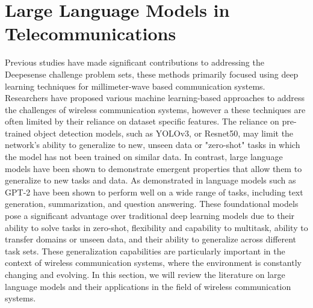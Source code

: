 \section{Large Language Models in Telecommunications}
Previous studies have made significant contributions to addressing the Deepesense challenge problem sets, these methods primarily focused using deep learning techniques for millimeter-wave based communication systems. Researchers have proposed various machine learning-based approaches to address the challenges of wireless communication systems, however a these techniques are often limited by their reliance on dataset specific features. The reliance on pre-trained object detection models, such as YOLOv3, or Resnet50, may limit the network's ability to generalize to new, unseen data or "zero-shot" tasks in which the model has not been trained on similar data. In contrast, large language models have been shown to demonstrate emergent properties that allow them to generalize to new tasks and data. As demonstrated in \cite{radford2019language} language models such as GPT-2 have been shown to perform well on a wide range of tasks, including text generation, summarization, and question answering. These foundational models pose a significant advantage over traditional deep learning models due to their ability to solve tasks in zero-shot, flexibility and capability to multitask, ability to transfer domains or unseen data, and their ability to generalize across different task sets. These generalization capabilities are particularly important in the context of wireless communication systems, where the environment is constantly changing and evolving. In this section, we will review the literature on large language models and their applications in the field of wireless communication systems.


